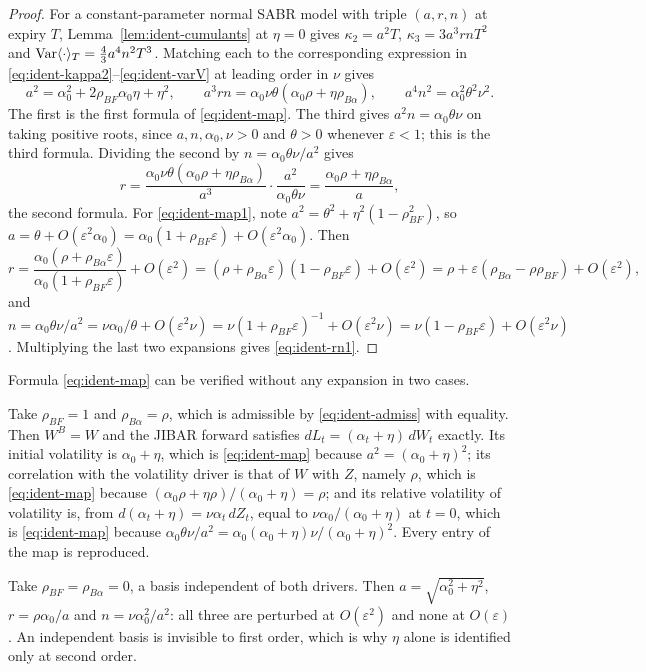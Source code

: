\documentclass[../../../main.tex]{subfiles}
\begin{document}
\begin{proof}
For a constant-parameter normal SABR model with triple $(a,r,n)$ at expiry $T$, Lemma~\ref{lem:ident-cumulants} at $\eta=0$ gives $\kappa_2=a^2T$, $\kappa_3=3a^3rnT^2$ and $\operatorname{Var}\langle\cdot\rangle_T=\tfrac43a^4n^2T^3$. Matching each to the corresponding expression in \eqref{eq:ident-kappa2}--\eqref{eq:ident-varV} at leading order in $\nu$ gives
\[
a^2=\alpha_0^2+2\rho_{BF}\alpha_0\eta+\eta^2,\qquad
a^3rn=\alpha_0\nu\theta(\alpha_0\rho+\eta\rho_{B\alpha}),\qquad
a^4n^2=\alpha_0^2\theta^2\nu^2 .
\]
The first is the first formula of \eqref{eq:ident-map}. The third gives $a^2n=\alpha_0\theta\nu$ on taking positive roots, since $a,n,\alpha_0,\nu>0$ and $\theta>0$ whenever $\varepsilon<1$; this is the third formula. Dividing the second by $n=\alpha_0\theta\nu/a^2$ gives
\[
r=\frac{\alpha_0\nu\theta(\alpha_0\rho+\eta\rho_{B\alpha})}{a^3}\cdot\frac{a^2}{\alpha_0\theta\nu}=\frac{\alpha_0\rho+\eta\rho_{B\alpha}}{a},
\]
the second formula. For \eqref{eq:ident-map1}, note $a^2=\theta^2+\eta^2(1-\rho_{BF}^2)$, so $a=\theta+O(\varepsilon^2\alpha_0)=\alpha_0(1+\rho_{BF}\varepsilon)+O(\varepsilon^2\alpha_0)$. Then
\[
r=\frac{\alpha_0(\rho+\rho_{B\alpha}\varepsilon)}{\alpha_0(1+\rho_{BF}\varepsilon)}+O(\varepsilon^2)=(\rho+\rho_{B\alpha}\varepsilon)(1-\rho_{BF}\varepsilon)+O(\varepsilon^2)=\rho+\varepsilon(\rho_{B\alpha}-\rho\rho_{BF})+O(\varepsilon^2),
\]
and $n=\alpha_0\theta\nu/a^2=\nu\alpha_0/\theta+O(\varepsilon^2\nu)=\nu(1+\rho_{BF}\varepsilon)^{-1}+O(\varepsilon^2\nu)=\nu(1-\rho_{BF}\varepsilon)+O(\varepsilon^2\nu)$. Multiplying the last two expansions gives \eqref{eq:ident-rn1}.
\end{proof}

\begin{remark}\label{rem:ident-checks}
Formula \eqref{eq:ident-map} can be verified without any expansion in two cases.

Take $\rho_{BF}=1$ and $\rho_{B\alpha}=\rho$, which is admissible by \eqref{eq:ident-admiss} with equality. Then $W^B=W$ and the JIBAR forward satisfies $dL_t=(\alpha_t+\eta)\,dW_t$ exactly. Its initial volatility is $\alpha_0+\eta$, which is \eqref{eq:ident-map} because $a^2=(\alpha_0+\eta)^2$; its correlation with the volatility driver is that of $W$ with $Z$, namely $\rho$, which is \eqref{eq:ident-map} because $(\alpha_0\rho+\eta\rho)/(\alpha_0+\eta)=\rho$; and its relative volatility of volatility is, from $d(\alpha_t+\eta)=\nu\alpha_t\,dZ_t$, equal to $\nu\alpha_0/(\alpha_0+\eta)$ at $t=0$, which is \eqref{eq:ident-map} because $\alpha_0\theta\nu/a^2=\alpha_0(\alpha_0+\eta)\nu/(\alpha_0+\eta)^2$. Every entry of the map is reproduced.

Take $\rho_{BF}=\rho_{B\alpha}=0$, a basis independent of both drivers. Then $a=\sqrt{\alpha_0^2+\eta^2}$, $r=\rho\alpha_0/a$ and $n=\nu\alpha_0^2/a^2$: all three are perturbed at $O(\varepsilon^2)$ and none at $O(\varepsilon)$. An independent basis is invisible to first order, which is why $\eta$ alone is identified only at second order.
\end{remark}
\end{document}
